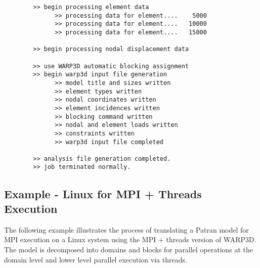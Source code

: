 \documentclass[11pt]{report}
\numberwithin{equation}{section}
\begin{document}
\begin{verbatim}
        >> begin processing element data
              >> processing data for element....    5000
              >> processing data for element....   10000
              >> processing data for element....   15000

        >> begin processing nodal displacement data

        >> use WARP3D automatic blocking assignment
        >> begin warp3d input file generation
              >> model title and sizes written
              >> element types written
              >> nodal coordinates written
              >> element incidences written
              >> blocking command written
              >> nodal and element loads written
              >> constraints written
              >> warp3d input file completed

        >> analysis file generation completed.
        >> job terminated normally.
\end{verbatim}
\normalsize

\subsection{Example - Linux for MPI + Threads Execution}
\noindent The following example illustrates the process of translating a Patran model
for MPI execution on a Linux system using the MPI + threads version of WARP3D.
The model is decomposed into domains and blocks for
parallel operations at the domain level and lower level parallel execution via
threads. 
\end{document}
